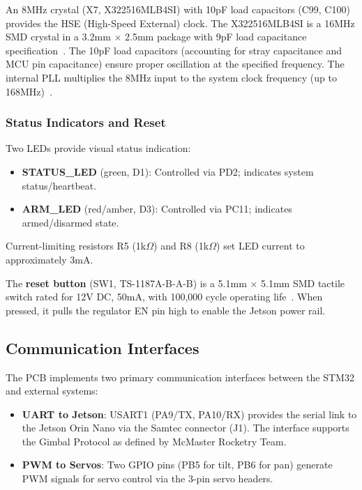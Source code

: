 \documentclass[12pt, titlepage]{article}
\begin{document}
An 8MHz crystal (X7, X322516MLB4SI) with 10pF load capacitors (C99, C100)
provides the HSE (High-Speed External) clock. The X322516MLB4SI is a 16MHz SMD
crystal in a 3.2mm $\times$ 2.5mm package with 9pF load capacitance
specification~\citep{YXC_X322516MLB4SI_2024}. The 10pF load capacitors
(accounting for stray capacitance and MCU pin capacitance) ensure proper
oscillation at the specified frequency. The internal PLL multiplies the 8MHz
input to the system clock frequency (up to 168MHz)~\citep{ST_STM32F405_2022}.

\subsubsection{Status Indicators and Reset}

Two LEDs provide visual status indication:

\begin{itemize}[leftmargin=*]
  \item \textbf{STATUS\_LED} (green, D1): Controlled via PD2; indicates
        system status/heartbeat.
  \item \textbf{ARM\_LED} (red/amber, D3): Controlled via PC11;
        indicates armed/disarmed state.
\end{itemize}

Current-limiting resistors R5 (1k$\Omega$) and R8 (1k$\Omega$) set LED current
to approximately 3mA.

The \textbf{reset button} (SW1, TS-1187A-B-A-B) is a 5.1mm $\times$ 5.1mm SMD
tactile switch rated for 12V DC, 50mA, with 100,000 cycle operating
life~\citep{XKB_TS1187A_2024}. When pressed, it pulls the regulator EN pin high
to enable the Jetson power rail.

\subsection{Communication Interfaces}
\label{subsec:communication}

The PCB implements two primary communication interfaces between the STM32 and
external systems:

\begin{itemize}[leftmargin=*]
  \item \textbf{UART to Jetson}: USART1 (PA9/TX, PA10/RX) provides the
        serial link to the Jetson Orin Nano via the Samtec connector (J1).
        The interface supports the Gimbal Protocol as defined by McMaster
        Rocketry Team.
  \item \textbf{PWM to Servos}: Two GPIO pins (PB5 for tilt, PB6 for pan)
        generate PWM signals for servo control via the 3-pin servo headers.
\end{itemize}
\end{document}
